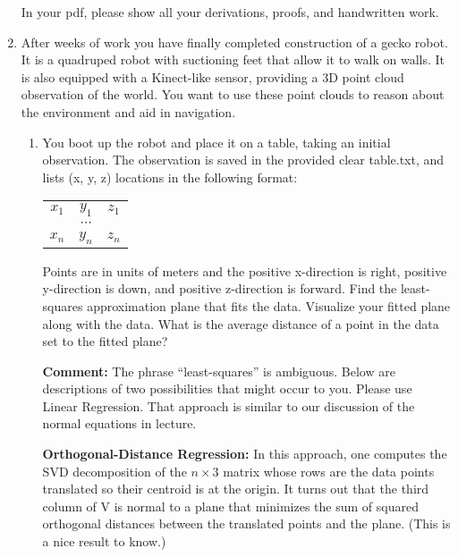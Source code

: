 \documentclass[conference,onecolumn]{IEEEtran}
\begin{document}
\begin{enumerate}[label=\arabic{enumi}.]
          In your pdf, please show all your derivations, proofs, and handwritten work.

    \item After weeks of work you have finally completed construction of a gecko robot.
          It is a quadruped robot with suctioning feet that allow it to walk on walls.
          It is also equipped with a Kinect-like sensor, providing a 3D point cloud observation of the world.
          You want to use these point clouds to reason about the environment and aid in navigation.
          \begin{enumerate}
              \item You boot up the robot and place it on a table, taking an initial observation.
                    The observation is saved in the provided clear table.txt, and lists (x, y, z) locations in the following format:
                    \begin{table}[H]
                        \centering
                        \begin{tabular}{ccc}
                            $x_1$ & $y_1$    & $z_1$ \\
                                  & $\cdots$ &       \\
                            $x_n$ & $y_n$    & $z_n$
                        \end{tabular}
                    \end{table}
                    Points are in units of meters and the positive x-direction is right, positive y-direction is down, and positive z-direction is forward.
                    Find the least-squares approximation plane that fits the data.
                    Visualize your fitted plane along with the data.
                    What is the average distance of a point in the data set to the fitted plane?

                    \textbf{Comment:} The phrase “least-squares” is ambiguous. Below are descriptions of two possibilities that might occur to you.
                    Please use Linear Regression.
                    That approach is similar to our discussion of the normal equations in lecture.

                    \textbf{Orthogonal-Distance Regression:} In this approach, one computes the SVD decomposition of the $n \times 3$ matrix whose rows are the data points translated so their centroid is at the origin.
                    It turns out that the third column of V is normal to a plane that minimizes the sum of squared orthogonal distances between the translated points and the plane.
                    (This is a nice result to know.)


\end{enumerate}
\end{enumerate}
\end{document}
